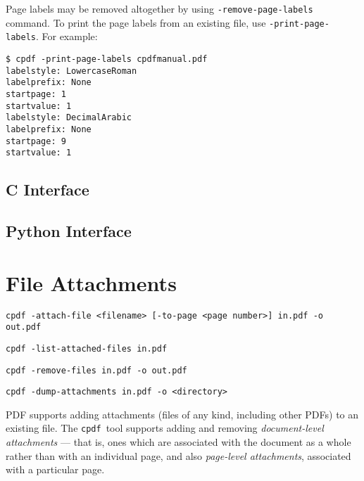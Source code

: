 \documentclass{book}
\newcommand{\cpdf}{\texttt{cpdf}}
\begin{document}
Page labels may be removed altogether by using \texttt{-remove-page-labels} command. To print the page labels from an existing file, use \texttt{-print-page-labels}. For example:
\begin{framed}\small\begin{verbatim}$ cpdf -print-page-labels cpdfmanual.pdf
labelstyle: LowercaseRoman
labelprefix: None
startpage: 1
startvalue: 1
labelstyle: DecimalArabic
labelprefix: None
startpage: 9
startvalue: 1
\end{verbatim}
\end{framed}\pagestyle{empty}\thispagestyle{fancy}

\begin{cpdflib}
\clearpage
\section*{C Interface}
\begin{small}\tt

\end{small}
\end{cpdflib}

\begin{pycpdflib}
\clearpage
\section*{Python Interface}
\begin{small}\tt

\end{small}
\end{pycpdflib}

\chapter{File Attachments}\label{chap:12}\pagestyle{fancy}
\begin{framed}
  \small\noindent\verb!cpdf -attach-file <filename> [-to-page <page number>] in.pdf -o out.pdf!

  \vspace{1.5mm}
  \small\noindent\verb!cpdf -list-attached-files in.pdf!
 
  \vspace{1.5mm}
  \small\noindent\verb!cpdf -remove-files in.pdf -o out.pdf!

  \vspace{1.5mm}
  \small\noindent\verb!cpdf -dump-attachments in.pdf -o <directory>!
\end{framed}
  PDF supports adding attachments (files of any kind, including other PDFs) to
an existing file. The \cpdf\ tool supports adding and removing \textit{document-level
attachments} --- that is, ones which are associated with the document as a
whole rather than with an individual page, and also \textit{page-level attachments}, associated with a particular page.
\end{document}
